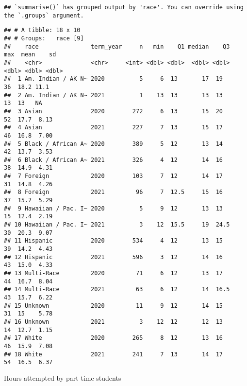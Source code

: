 \documentclass[]{article}
\begin{document}
\begin{verbatim}
## `summarise()` has grouped output by 'race'. You can override using the `.groups` argument.
\end{verbatim}

\begin{verbatim}
## # A tibble: 18 x 10
## # Groups:   race [9]
##    race               term_year     n   min    Q1 median    Q3   max  mean    sd
##    <chr>              <chr>     <int> <dbl> <dbl>  <dbl> <dbl> <dbl> <dbl> <dbl>
##  1 Am. Indian / AK N~ 2020          5     6  13       17  19      36  18.2 11.1 
##  2 Am. Indian / AK N~ 2021          1    13  13       13  13      13  13   NA   
##  3 Asian              2020        272     6  13       15  20      52  17.7  8.13
##  4 Asian              2021        227     7  13       15  17      46  16.8  7.00
##  5 Black / African A~ 2020        389     5  12       13  14      42  13.7  3.53
##  6 Black / African A~ 2021        326     4  12       14  16      38  14.9  4.31
##  7 Foreign            2020        103     7  12       14  17      31  14.8  4.26
##  8 Foreign            2021         96     7  12.5     15  16      37  15.7  5.29
##  9 Hawaiian / Pac. I~ 2020          5     9  12       13  13      15  12.4  2.19
## 10 Hawaiian / Pac. I~ 2021          3    12  15.5     19  24.5    30  20.3  9.07
## 11 Hispanic           2020        534     4  12       13  15      39  14.2  4.43
## 12 Hispanic           2021        596     3  12       14  16      43  15.0  4.33
## 13 Multi-Race         2020         71     6  12       13  17      44  16.7  8.04
## 14 Multi-Race         2021         63     6  12       14  16.5    43  15.7  6.22
## 15 Unknown            2020         11     9  12       14  15      31  15    5.78
## 16 Unknown            2021          3    12  12       12  13      14  12.7  1.15
## 17 White              2020        265     8  12       13  16      46  15.9  7.08
## 18 White              2021        241     7  13       14  17      54  16.5  6.37
\end{verbatim}

Hours attempted by part time students
\end{document}

